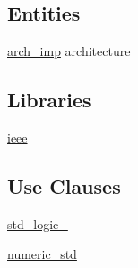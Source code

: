 \subsection*{Entities}
\begin{DoxyCompactItemize}
\item 
\hyperlink{classmy_g_p_i_o_1_1arch__imp}{arch\+\_\+imp} architecture
\end{DoxyCompactItemize}
\subsection*{Libraries}
 \begin{DoxyCompactItemize}
\item 
\hypertarget{classmy_g_p_i_o_ga0a6af6eef40212dbaf130d57ce711256}{\hyperlink{group__my_g_p_i_o_ga0a6af6eef40212dbaf130d57ce711256}{ieee} }\label{classmy_g_p_i_o_ga0a6af6eef40212dbaf130d57ce711256}

\end{DoxyCompactItemize}
\subsection*{Use Clauses}
 \begin{DoxyCompactItemize}
\item 
\hypertarget{classmy_g_p_i_o_gacd03516902501cd1c7296a98e22c6fcb}{\hyperlink{group__my_g_p_i_o_gacd03516902501cd1c7296a98e22c6fcb}{std\+\_\+logic\+\_}   }\label{classmy_g_p_i_o_gacd03516902501cd1c7296a98e22c6fcb}

\item 
\hypertarget{classmy_g_p_i_o_ga2edc34402b573437d5f25fa90ba4013e}{\hyperlink{group__my_g_p_i_o_ga2edc34402b573437d5f25fa90ba4013e}{numeric\+\_\+std}   }\label{classmy_g_p_i_o_ga2edc34402b573437d5f25fa90ba4013e}

\end{DoxyCompactItemize}
